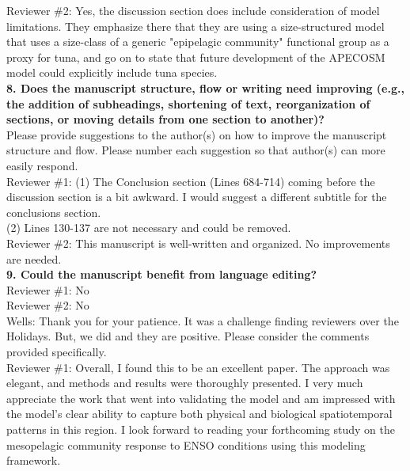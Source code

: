 \documentclass{article}
\begin{document}
Reviewer \#2: Yes, the discussion section does include consideration of model limitations. They emphasize there that they are using a size-structured model that uses a size-class of a generic "epipelagic community" functional group as a proxy for tuna, and go on to state that future development of the APECOSM model could explicitly include tuna species.\\

\textbf{8. Does the manuscript structure, flow or writing need improving (e.g., the addition of subheadings, shortening of text, reorganization of sections, or moving details from one section to another)?}\\

Please provide suggestions to the author(s) on how to improve the manuscript structure and flow. Please number each suggestion so that author(s) can more easily respond.\\

Reviewer \#1: (1) The Conclusion section (Lines 684-714) coming before the discussion section is a bit awkward. I would suggest a different subtitle for the conclusions section.\\
(2) Lines 130-137 are not necessary and could be removed.\\



Reviewer \#2: This manuscript is well-written and organized. No improvements are needed.\\

\textbf{9. Could the manuscript benefit from language editing?}\\

Reviewer \#1: No\\

Reviewer \#2: No\\

Wells: Thank you for your patience. It was a challenge finding reviewers over the Holidays. But, we did and they are positive. Please consider the comments provided specifically.\\

Reviewer \#1: Overall, I found this to be an excellent paper. The approach was elegant, and methods and results were thoroughly presented. I very much appreciate the work that went into validating the model and am impressed with the model's clear ability to capture both physical and biological spatiotemporal patterns in this region. I look forward to reading your forthcoming study on the mesopelagic community response to ENSO conditions using this modeling framework.\\
\end{document}
